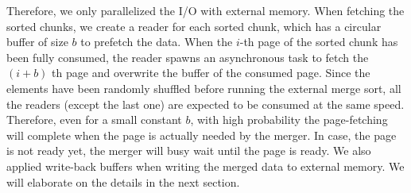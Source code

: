 \documentclass{article}
\begin{document}
Therefore, we only parallelized the I/O with external memory. When fetching the sorted chunks, we create a reader for each sorted chunk, which has a circular buffer of size $b$ to prefetch the data. When the $i$-th page of the sorted chunk has been fully consumed, the reader spawns an asynchronous task to fetch the $(i+b)$ th page and overwrite the buffer of the consumed page. Since the elements have been randomly shuffled before running the external merge sort, all the readers (except the last one) are expected to be consumed at the same speed. Therefore, even for a small constant $b$, with high probability the page-fetching will complete when the page is actually needed by the merger. In case, the page is not ready yet, the merger will busy wait until the page is ready. We also applied write-back buffers when writing the merged data to external memory. We will elaborate on the details in the next section.
\end{document}
